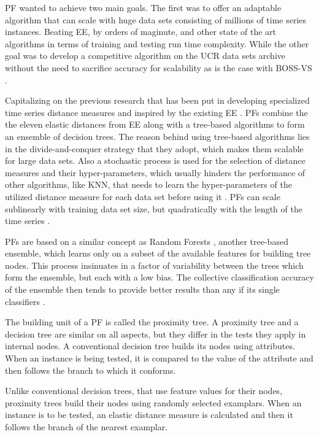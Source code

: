 PF wanted to achieve two main goals. The first was to offer an adaptable algorithm that can scale with huge data sets consisting of millions of time series instances.
Beating EE, by orders of maginute, and other state of the art algorithms in terms of training and testing run time complexity.
While the other goal was to develop a competitive algorithm on the UCR data sets archive without the need to sacrifice accuracy for scalability as is the case with BOSS-VS \cite{lucas2019proximity}.


Capitalizing on the previous research that has been put in developing specialized time series distance measures and inspired by the existing EE \cite{fawaz2020inceptiontime,fawaz2019deep}.
PFs combine the the eleven elastic distances from EE along with a tree-based algorithms to form an ensemble of decision trees.
The reason behind using tree-based algorithms lies in the divide-and-conquer strategy that they adopt, which makes them scalable for large data sets.
Also a stochastic process is used for the selection of distance measures and their hyper-parameters, which usually hinders the performance of other algorithms,
like KNN, that needs to learn the hyper-parameters of the utilized distance measure for each data set before using it \cite{lucas2019proximity}.
PFs can scale sublinearly with training data set size, but quadratically with the length of the time series \cite{shifaz2020ts}.

PFs are based on a similar concept as Random Forests \cite{breiman2001random}, another tree-based ensemble, which learns only on a subset of the available features
for building tree nodes. This process insinuates in a factor of variability between the trees which form the ensemble, but each with a low bias.
The collective classification accuracy of the ensemble then tends to provide better results than any if its single classifiers \cite{lucas2019proximity}.

The building unit of a PF is called the proximity tree. A proximity tree and a decision tree are similar on all aspects,
but they differ in the tests they apply in internal nodes.
A conventional decision tree builds its nodes using attributes. When an instance is being tested, it is compared to the value of the attribute
and then follows the branch to which it conforms.

Unlike conventional decision trees, that use feature values for their nodes, proximity trees build their nodes using randomly selected examplars.
When an instance is to be tested, an elastic distance measure is calculated and then it follows the branch of the nearest examplar.

